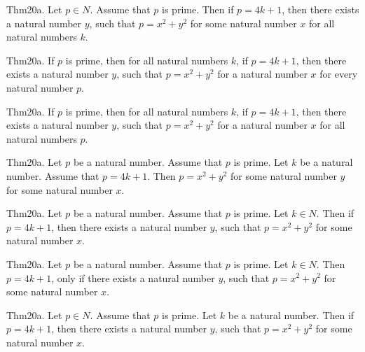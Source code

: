 \documentclass{article}
\begin{document}
Thm20a. Let $p \in N$. Assume that $p$ is prime. Then if $p = 4 k + 1$, then there exists a natural number $y$, such that $p = x ^{ 2}+ y ^{ 2}$ for some natural number $x$ for all natural numbers $k$.

Thm20a. If $p$ is prime, then for all natural numbers $k$, if $p = 4 k + 1$, then there exists a natural number $y$, such that $p = x ^{ 2}+ y ^{ 2}$ for a natural number $x$ for every natural number $p$.

Thm20a. If $p$ is prime, then for all natural numbers $k$, if $p = 4 k + 1$, then there exists a natural number $y$, such that $p = x ^{ 2}+ y ^{ 2}$ for a natural number $x$ for all natural numbers $p$.

Thm20a. Let $p$ be a natural number. Assume that $p$ is prime. Let $k$ be a natural number. Assume that $p = 4 k + 1$. Then $p = x ^{ 2}+ y ^{ 2}$ for some natural number $y$ for some natural number $x$.

Thm20a. Let $p$ be a natural number. Assume that $p$ is prime. Let $k \in N$. Then if $p = 4 k + 1$, then there exists a natural number $y$, such that $p = x ^{ 2}+ y ^{ 2}$ for some natural number $x$.

Thm20a. Let $p$ be a natural number. Assume that $p$ is prime. Let $k \in N$. Then $p = 4 k + 1$, only if there exists a natural number $y$, such that $p = x ^{ 2}+ y ^{ 2}$ for some natural number $x$.

Thm20a. Let $p \in N$. Assume that $p$ is prime. Let $k$ be a natural number. Then if $p = 4 k + 1$, then there exists a natural number $y$, such that $p = x ^{ 2}+ y ^{ 2}$ for some natural number $x$.
\end{document}
